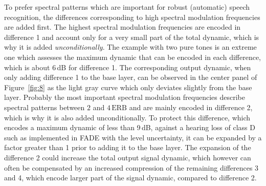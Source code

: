 \documentclass[10pt,a4paper,twocolumn]{article}
\begin{document}
To prefer spectral patterns which are important for robust (automatic) speech recognition, the differences corresponding to high spectral modulation frequencies are added first.
%
The highest spectral modulation frequencies are encoded in difference 1 and account only for a very small part of the total dynamic, which is why it is added \emph{unconditionally}.
%
The example with two pure tones is an extreme one which assesses the maximum dynamic that can be encoded in each difference, which is about 6\,dB for difference 1.
%
The corresponding output dynamic, when only adding difference 1 to the base layer, can be observed in the center panel of Figure~\ref{fig:8} as the light gray curve which only deviates slightly from the base layer.
%
Probably the most important spectral modulation frequencies describe spectral patterns between $2$ and $4\,\text{ERB}$ and are mainly encoded in difference 2, which is why it is also added unconditionally.
%
To protect this difference, which encodes a maximum dynamic of less than 9\,dB, against a hearing loss of class D such as implemented in FADE with the level uncertainty, it can be expanded by a factor greater than 1 prior to adding it to the base layer.
%
The expansion of the difference 2 could increase the total output signal dynamic, which however can often be compensated by an increased compression of the remaining differences 3 and 4, which encode larger part of the signal dynamic, compared to difference 2.
\end{document}
